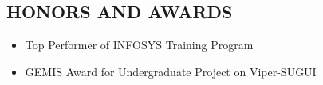 \documentclass{res}
\begin{document}
\begin{resume}
\section{HONORS AND AWARDS}      
    \begin{itemize}
    	\item Top Performer of INFOSYS Training Program
    	\item GEMIS Award for Undergraduate Project on Viper-SUGUI
    \end{itemize}


 
\end{resume}
\end{document}
